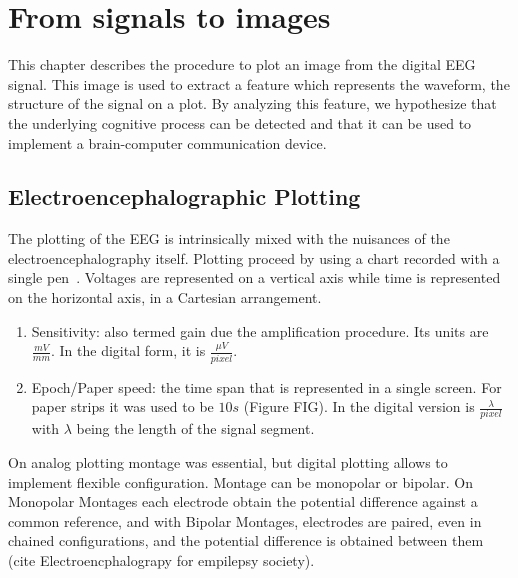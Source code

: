 \chapter{From signals to images}
\label{chapter:two}


This chapter describes the procedure to plot an image from the digital EEG signal.  This image is used to extract a feature which represents the waveform, the structure of the signal on a plot.  By analyzing this feature, we hypothesize that the underlying cognitive process can be detected and that it can be used to implement a brain-computer communication device.

\section{Electroencephalographic Plotting}

The plotting of the EEG is intrinsically mixed with the nuisances of the electroencephalography itself.  Plotting proceed by using a chart recorded with a single pen~\cite{Jestico1977}.   Voltages are represented on a vertical axis while time is represented on the horizontal axis, in a Cartesian arrangement. 

\begin{enumerate}
\item Sensitivity: also termed gain due the amplification procedure.  Its units are $ \frac{mV}{mm}$.  In the digital form, it is $\frac{\mu V}{pixel}$.
\item Epoch/Paper speed: the time span that is represented in a single screen.  For paper strips it was used to be $10s$ (Figure FIG).  In the digital version is $ \frac{\lambda}{pixel}$ with $\lambda$ being the length of the signal segment.
\end{enumerate}

On analog plotting montage was essential, but digital plotting allows to implement flexible configuration.  Montage can be monopolar or bipolar.  On Monopolar Montages each electrode obtain the potential difference against a common reference, and with Bipolar Montages, electrodes are paired, even in chained configurations, and the potential difference is obtained between them (cite Electroencphalograpy for empilepsy society).



